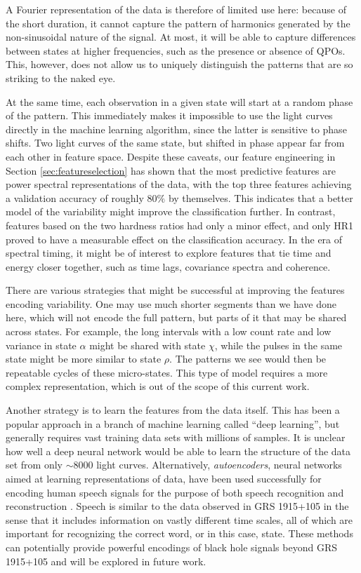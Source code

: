 \documentclass[fleqn,usenatbib]{mnras}
\begin{document}
A Fourier representation of the data is therefore of limited use here: because of the short duration, it cannot capture the pattern of harmonics generated by the non-sinusoidal nature of the signal. At most, it will be able to capture differences between states at higher frequencies, such as the presence or absence of QPOs. This, however, does not allow us to uniquely distinguish the patterns that are so striking to the naked eye. 

At the same time, each observation in a given state will start at a random phase of the pattern. This immediately makes it impossible to use the light curves directly 
in the machine learning algorithm, since the latter is sensitive to phase shifts. Two light curves of the same state, but shifted in phase appear far 
from each other in feature space. Despite these caveats, our feature engineering in Section \ref{sec:featureselection} has shown that 
the most predictive features are power spectral representations of the data, with the top three features achieving a validation accuracy of roughly $80\%$ by themselves.
This indicates that a better model of the variability might improve the classification further. In contrast, features based on the two hardness ratios had only a minor effect, and only HR1 proved to have a measurable effect on the classification accuracy. In the era of spectral timing, it might be of interest to explore features that tie time and energy closer 
together, such as time lags, covariance spectra and coherence.

There are various strategies that might be successful at improving the features encoding variability. One may use much shorter segments than we have done here, 
which will not encode the full pattern, but parts of it that may be shared across states. For example, the long intervals with a low count rate and low variance in state 
$\alpha$ might be shared with state $\chi$, while the pulses in the same state might be more similar to state $\rho$. The patterns we see would then be repeatable 
cycles of these micro-states. This type of model requires a more complex representation, which is out of the scope of this current work. 

Another strategy is to learn the features from the data itself. This has been a popular approach in a branch of machine learning called ``deep learning'', but generally 
requires vast training data sets with millions of samples. It is unclear how well a deep neural network would be able to learn the structure of the data set from only 
$\sim 8000$ light curves. Alternatively, \textit{autoencoders}, neural networks aimed at learning representations of data, have been used successfully for encoding 
human speech signals for the purpose of both speech recognition and reconstruction \citep[for an overview, see e.g.][]{hinton2012}. 
Speech is similar to the data observed in GRS 1915+105 in the sense that it includes information on vastly different time scales, all of which are important for recognizing the correct word, or in this case, state. These methods can potentially provide powerful encodings of black hole signals beyond GRS 1915+105 and will be explored in future work. 
\end{document}
